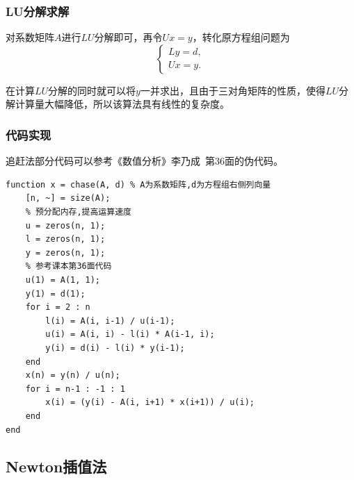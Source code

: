 \documentclass[12pt, a4paper, oneside]{ctexart}
\begin{document}
\subsubsection{LU分解求解}
对系数矩阵$A$进行$LU$分解即可，再令$Ux = y$，转化原方程组问题为
\begin{equation*}
    \begin{cases}
        Ly = d,\\Ux=y.
    \end{cases}
\end{equation*}

在计算$LU$分解的同时就可以将$y$一并求出，且由于三对角矩阵的性质，使得$LU$分解计算量大幅降低，所以该算法具有线性的复杂度。

\subsubsection{代码实现}
追赶法部分代码可以参考《数值分析》李乃成\ 第$36$面的伪代码。
\begin{lstlisting}
function x = chase(A, d) % A为系数矩阵,d为方程组右侧列向量
    [n, ~] = size(A);
    % 预分配内存,提高运算速度
    u = zeros(n, 1);
    l = zeros(n, 1);
    y = zeros(n, 1);
    % 参考课本第36面代码
    u(1) = A(1, 1);
    y(1) = d(1);
    for i = 2 : n
        l(i) = A(i, i-1) / u(i-1);
        u(i) = A(i, i) - l(i) * A(i-1, i);
        y(i) = d(i) - l(i) * y(i-1);
    end
    x(n) = y(n) / u(n);
    for i = n-1 : -1 : 1
        x(i) = (y(i) - A(i, i+1) * x(i+1)) / u(i);
    end
end
\end{lstlisting}
\subsection{Newton插值法}
\end{document}
